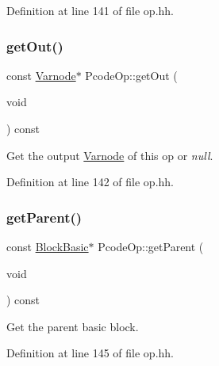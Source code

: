 Definition at line 141 of file op.\+hh.

\mbox{\label{class_pcode_op_a9a19bc5173dd16de72f4667f7c49571c}} 
\subsubsection{\texorpdfstring{getOut()}{getOut()}\hspace{0.1cm}{\footnotesize\ttfamily [2/2]}}
{\footnotesize\ttfamily const \mbox{\hyperlink{class_varnode}{Varnode}}$\ast$ Pcode\+Op\+::get\+Out (\begin{DoxyParamCaption}\item[{void}]{ }\end{DoxyParamCaption}) const\hspace{0.3cm}{\ttfamily [inline]}}



Get the output \mbox{\hyperlink{class_varnode}{Varnode}} of this op or {\itshape null}. 



Definition at line 142 of file op.\+hh.

\mbox{\label{class_pcode_op_ab3f2abf80e742d5c33e41d68d36d3e33}} 
\subsubsection{\texorpdfstring{getParent()}{getParent()}\hspace{0.1cm}{\footnotesize\ttfamily [1/2]}}
{\footnotesize\ttfamily const \mbox{\hyperlink{class_block_basic}{Block\+Basic}}$\ast$ Pcode\+Op\+::get\+Parent (\begin{DoxyParamCaption}\item[{void}]{ }\end{DoxyParamCaption}) const\hspace{0.3cm}{\ttfamily [inline]}}



Get the parent basic block. 



Definition at line 145 of file op.\+hh.

\mbox{\label{class_pcode_op_a047ba0aec5d9ead44390d69834ab3cab}} 
